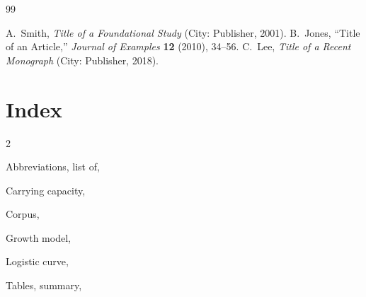 \documentclass[12pt,a4paper,twoside,openright]{book}
\numberwithin{equation}{chapter}
\begin{document}
\backmatter

\begin{thebibliography}{99}
 A.~Smith, \emph{Title of a Foundational Study} (City: Publisher, 2001).
 B.~Jones, ``Title of an Article,'' \emph{Journal of Examples} \textbf{12} (2010), 34--56.
 C.~Lee, \emph{Title of a Recent Monograph} (City: Publisher, 2018).
\end{thebibliography}

\chapter*{Index}
\begin{multicols}{2}
\raggedright\small
Abbreviations, list of, \pageref{chap:abbr}\par
Carrying capacity, \pageref{eq:growth}\par
Corpus, \pageref{sec:corpus}\par
Growth model, \pageref{sec:growth}\par
Logistic curve, \pageref{fig:growth}\par
Tables, summary, \pageref{tab:summary}\par
\end{multicols}
\end{document}
